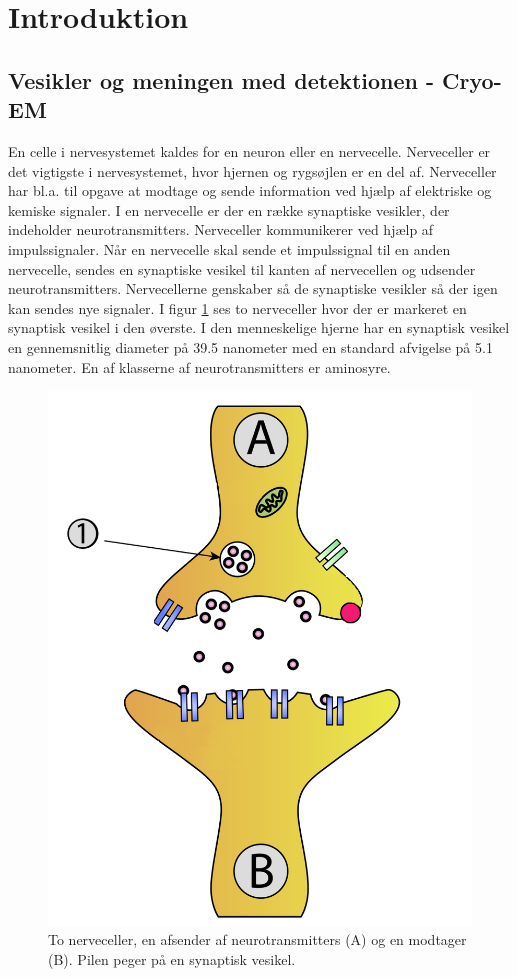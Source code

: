 \section{Introduktion}
\subsection{Vesikler og meningen med detektionen - Cryo-EM}
En celle i nervesystemet kaldes for en neuron eller en nervecelle. Nerveceller er det vigtigste i nervesystemet, hvor hjernen og rygsøjlen er en del af. Nerveceller har bl.a. til opgave at modtage og sende information ved hjælp af elektriske og kemiske signaler. I en nervecelle er der en række synaptiske vesikler, der indeholder neurotransmitters. Nerveceller kommunikerer ved hjælp af impulssignaler. Når en nervecelle skal sende et impulssignal til en anden nervecelle, sendes en synaptiske vesikel til kanten af nervecellen og udsender neurotransmitters. Nervecellerne genskaber så de synaptiske vesikler så der igen kan sendes nye signaler. I figur \ref{fig:intro_syntrans} ses to nerveceller hvor der er markeret en synaptisk vesikel i den øverste. I den menneskelige hjerne har en synaptisk vesikel en gennemsnitlig diameter på 39.5 nanometer med en standard afvigelse på 5.1 nanometer. En af klasserne af neurotransmitters er aminosyre.

\begin{figure}[H]
	\centering
	\includegraphics[scale=0.2]{files/intro/img/synTransmitter.png}
	\caption{To nerveceller, en afsender af neurotransmitters (A) og en modtager (B). Pilen peger på en synaptisk vesikel.\label{fig:intro_syntrans}}
\end{figure} 

